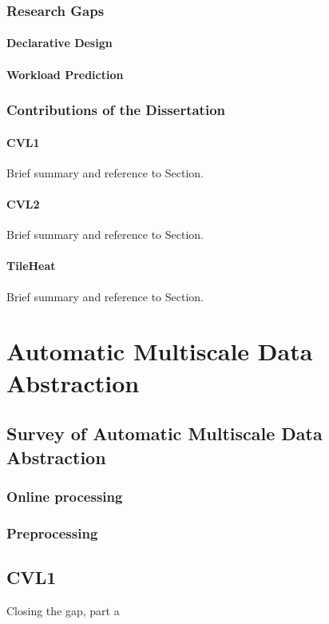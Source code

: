 \documentclass[11pt, oneside]{report}   	%
\begin{document}
\section{Research Gaps}
\subsection{Declarative Design}
\subsection{Workload Prediction}

\section{Contributions of the Dissertation}

\subsection{CVL1}
Brief summary and reference to Section.
\subsection{CVL2}
Brief summary and reference to Section.
\subsection{TileHeat}
Brief summary and reference to Section.


\part{Automatic Multiscale Data Abstraction}

\chapter{Survey of Automatic Multiscale Data Abstraction}

\section{Online processing}

\section{Preprocessing}

\chapter{CVL1}
Closing the gap, part a
\end{document}
